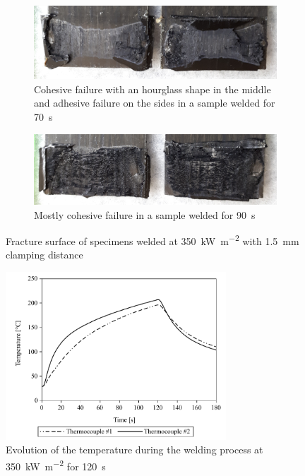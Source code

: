 \documentclass[11pt,review,times]{elsarticle}
\begin{document}
\begin{figure}[htb]
	\center
	\captionsetup{width=125mm}
	\begin{subfigure}{125mm}
		\center
		\captionsetup{width=125mm}
		\includegraphics[width=125mm]{350kW-70-10-150-1UD_crop.jpg}
		\caption{Cohesive failure with an hourglass shape in the middle and adhesive failure on the sides in a sample welded for \SI{70}{\s}}
		\label{fig:fracture_surface_70s}
	\end{subfigure}
	\begin{subfigure}{125mm}
		\center
		\captionsetup{width=125mm}
		\includegraphics[width=125mm]{350kW-90-10-150-3UD_crop.jpg}
		\caption{Mostly cohesive failure in a sample welded for \SI{90}{\s}}
		\label{fig:fracture_surface_90s}
	\end{subfigure}%
	\caption{Fracture surface of specimens welded at \SI{350}{\kW\per\square\metre} with \SI{1.5}{\mm} clamping distance}
	\label{fig:fracture_surface}
\end{figure}

\begin{figure}[h]
	\center
	\captionsetup{width=78mm}
	\includegraphics[width=3.25in]{temp_welding_350kw.pdf}
	\caption{Evolution of the temperature during the welding process at \SI{350}{\kilo\watt\per\square\metre} for \SI{120}{\second}}
	\label{fig:temp_350kW_120_10_150_3UD}
\end{figure}
\end{document}
